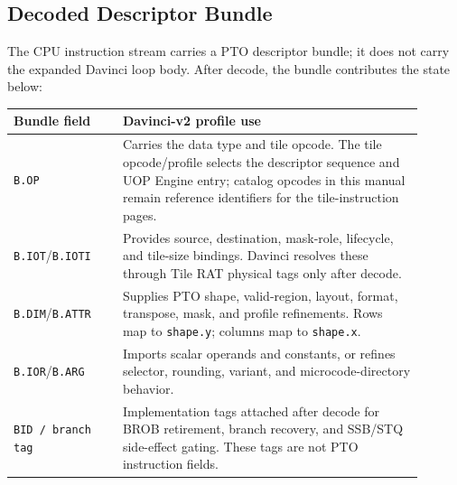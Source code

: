 \subsection{Decoded Descriptor Bundle}
The CPU instruction stream carries a PTO descriptor bundle; it does not carry the expanded Davinci loop body. After decode, the bundle contributes the state below:
\begin{longtable}{@{}L{0.24\linewidth}L{0.66\linewidth}@{}}
\toprule
Bundle field & Davinci-v2 profile use \\
\midrule
\texttt{B.OP} & Carries the data type and tile opcode. The tile opcode/profile selects the descriptor sequence and UOP Engine entry; catalog opcodes in this manual remain reference identifiers for the tile-instruction pages. \\
\texttt{B.IOT}/\texttt{B.IOTI} & Provides source, destination, mask-role, lifecycle, and tile-size bindings. Davinci resolves these through Tile RAT physical tags only after decode. \\
\texttt{B.DIM}/\texttt{B.ATTR} & Supplies PTO shape, valid-region, layout, format, transpose, mask, and profile refinements. Rows map to \texttt{shape.y}; columns map to \texttt{shape.x}. \\
\texttt{B.IOR}/\texttt{B.ARG} & Imports scalar operands and constants, or refines selector, rounding, variant, and microcode-directory behavior. \\
\texttt{BID / branch tag} & Implementation tags attached after decode for BROB retirement, branch recovery, and SSB/STQ side-effect gating. These tags are not PTO instruction fields. \\
\bottomrule
\end{longtable}

